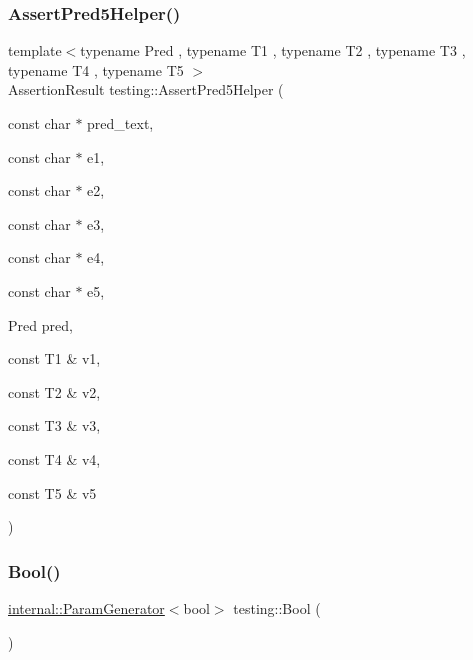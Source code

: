 \mbox{\label{namespacetesting_addcf52b273ce17269cbf4956cfe600a6}} 
\subsubsection{\texorpdfstring{Assert\+Pred5\+Helper()}{AssertPred5Helper()}}
{\footnotesize\ttfamily template$<$typename Pred , typename T1 , typename T2 , typename T3 , typename T4 , typename T5 $>$ \\
Assertion\+Result testing\+::\+Assert\+Pred5\+Helper (\begin{DoxyParamCaption}\item[{const char $\ast$}]{pred\+\_\+text,  }\item[{const char $\ast$}]{e1,  }\item[{const char $\ast$}]{e2,  }\item[{const char $\ast$}]{e3,  }\item[{const char $\ast$}]{e4,  }\item[{const char $\ast$}]{e5,  }\item[{Pred}]{pred,  }\item[{const T1 \&}]{v1,  }\item[{const T2 \&}]{v2,  }\item[{const T3 \&}]{v3,  }\item[{const T4 \&}]{v4,  }\item[{const T5 \&}]{v5 }\end{DoxyParamCaption})}

\mbox{\label{namespacetesting_aa9f9150ed43f949c8a6bacf3f04c03ce}} 
\subsubsection{\texorpdfstring{Bool()}{Bool()}}
{\footnotesize\ttfamily \hyperlink{classtesting_1_1internal_1_1ParamGenerator}{internal\+::\+Param\+Generator}$<$bool$>$ testing\+::\+Bool (\begin{DoxyParamCaption}{ }\end{DoxyParamCaption})\hspace{0.3cm}{\ttfamily [inline]}}

\mbox{\label{namespacetesting_a2cb3b8fe262f59bf150998eb8fd0752d}} 
